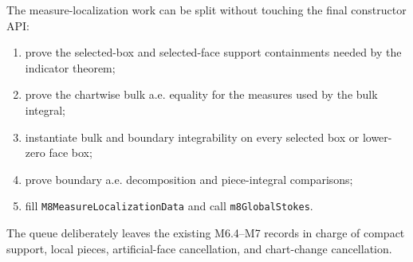\begin{theorem}
  \label{anc:m8_measure_localization_worker_queue}
  The measure-localization work can be split without touching the final
  constructor API:
  \begin{enumerate}
    \item prove the selected-box and selected-face support containments needed
      by the indicator theorem;
    \item prove the chartwise bulk a.e. equality for the measures used by the
      bulk integral;
    \item instantiate bulk and boundary integrability on every selected box or
      lower-zero face box;
    \item prove boundary a.e. decomposition and piece-integral comparisons;
    \item fill \texttt{M8MeasureLocalizationData} and call
      \texttt{m8GlobalStokes}.
  \end{enumerate}
  The queue deliberately leaves the existing M6.4--M7 records in charge of
  compact support, local pieces, artificial-face cancellation, and chart-change
  cancellation.
\end{theorem}

